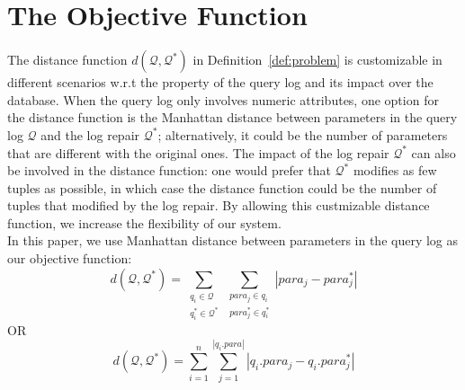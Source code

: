 \section{The Objective Function}


The distance function $d(\mathcal{Q}, \mathcal{Q}^*)$ 
in Definition~\ref{def:problem} is customizable 
in different scenarios w.r.t the property of the query log and its
impact over the database. 
When the query log only involves numeric attributes, one option for 
the distance function is the Manhattan distance between parameters in 
the query log $\mathcal{Q}$ and the log repair $\mathcal{Q}^*$; 
alternatively, it could be the number of 
parameters that are different with the original ones. The
impact of the log repair $\mathcal{Q}^*$ can also be involved 
in the distance function: one would prefer that $\mathcal{Q}^*$
modifies as few tuples as possible, in which case the distance 
function could be the number of tuples that modified by the log repair.
By allowing this custmizable distance function, we increase the flexibility 
of our system. \\
In this paper, we use Manhattan distance between parameters 
in the query log as our objective function: 
\[d(\mathcal{Q}, \mathcal{Q}^*) = \sum\limits_{\substack{ q_i \in \mathcal{Q}\\ q_i^* \in \mathcal{Q}^*}}  
\sum\limits_{\substack{para_j \in q_i\\ para_j^* \in q_i^*}}|para_j - para_j^*|\]
OR
\[d(\mathcal{Q}, \mathcal{Q}^*) = \sum_{i = 1} ^{n} \sum_{j = 1}^{|q_i.para|} |q_i.para_j - q_i.para_j^*|\]
